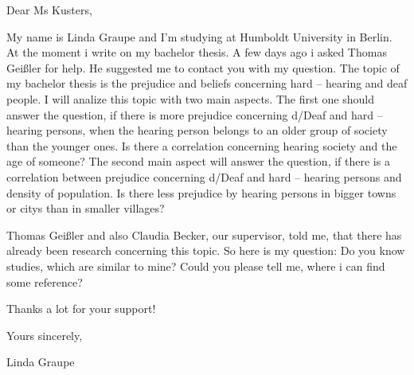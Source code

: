 \documentclass[british,11pt,a4paper]{memoir}
\begin{document}
Dear Ms Kusters,

My name is Linda Graupe and I'm studying at Humboldt University in Berlin. At the moment i write on my bachelor thesis. A few days ago i asked Thomas Geißler for help. He suggested me to contact you with my question. The topic of my bachelor thesis is the prejudice and beliefs concerning hard – hearing and deaf people. I will analize this topic with two main aspects. The first one should answer the question, if there is more prejudice concerning d/Deaf and hard – hearing persons, when the hearing person belongs to an older group of society than the younger ones. Is there a correlation concerning hearing society and the age of someone? The second main aspect will answer the question, if there is a correlation between  prejudice concerning d/Deaf and hard – hearing persons and density of population. Is there less prejudice by hearing persons in bigger towns or citys than in smaller villages?

Thomas Geißler and also Claudia Becker, our supervisor, told me, that there has already been research concerning this topic. So here is my question: Do you know studies, which are similar to mine? Could you please tell me, where i can find some reference?

Thanks a lot for your support!

Yours sincerely,

Linda Graupe
\end{document}
